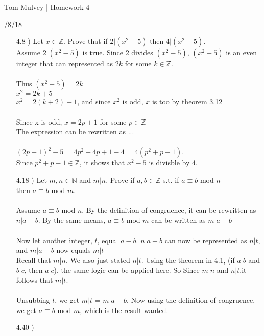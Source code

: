 \documentclass[12pt]{article}
\newcommand{\N}{\mathbb N}
\newcommand{\Z}{\mathbb Z}
\newcommand{\ind}{\hspace{10mm}}
\begin{document}
    \centerline{\sc \large Tom Mulvey | Homework 4 }
    \centerline{/8/18}

    \vspace{2pc}

	\begin{enumerate}
		\item[4.8])
			Let $x \in \Z$. Prove that if $2|(x^2-5)$ then $4|(x^2-5)$. \\
			\ind Assume $2|(x^2-5)$ is true. Since 2 divides $(x^2-5)$, $(x^2-5)$
			is an even integer that can represented as $2k$ for some $k\in\Z$.\\
			\\Thus $(x^2-5)=2k$\\
			$x^2=2k+5$\\
			$x^2=2(k+2)+1$, and since $x^2$ is odd, $x$ is too by theorem 3.12\\
			\\Since x is odd, $x=2p+1$ for some $p\in\Z$\\
			The expression can be rewritten as ...\\
			\\$(2p+1)^2 - 5$ = $4p^2 + 4p + 1 - 4$ = $4(p^2 + p - 1)$.\\
			Since $p^2+p-1\in\Z$, it shows that $x^2-5$ is divisble by 4. 
			\fboxsep=2mm \fboxrule=1mm 
		\item[4.18])
			Let $m,n\in\N$ and $m|n$. Prove if $a,b\in\Z$ s.t. if $a \equiv b$ mod $n$ \\
			then $a\equiv b$ mod $m$.\\
			\\Assume $a \equiv b$ mod $n$. By the definition of congruence, it can
			be rewritten as $n|a-b$. By the same means, $a\equiv b$ mod $m$ can be 
			written as $m|a-b$\\
			\\Now let another integer, $t$, equal $a-b$. $n|a-b$ can now be represented
			as $n|t$, and $m|a-b$ now equals $m|t$ 
			\\Recall that $m|n$. We also just stated $n|t$. Using the theorem in 4.1,
			(if $a|b$ and $b|c$, then $a|c$), the same logic can be applied here. So Since
			$m|n$ and $n|t$,it follows that $m|t$. \\
			\\Unsubbing $t$, we get $m|t$ = $m|a-b$. Now using the definition of
			congruence, we get $a \equiv b$ mod $m$, which is the result wanted.
			\fboxsep=2mm \fboxrule=1mm 
		\item[4.40])

\end{enumerate}
\end{document}
